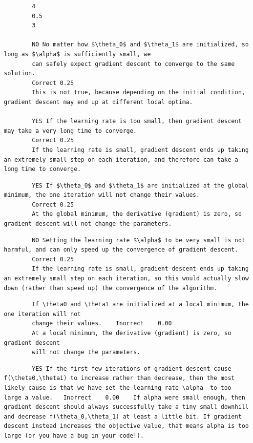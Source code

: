 \documentclass[11pt]{article} %
\begin{document}
	
	
	
	
	\newpage
		
		
		
		
		\begin{verbatim}
		4
		0.5
		3
		
		NO No matter how $\theta_0$ and $\theta_1$ are initialized, so long as $\alpha$ is sufficiently small, we 
		can safely expect gradient descent to converge to the same solution.	
		Correct	0.25	
		This is not true, because depending on the initial condition, gradient descent may end up at different local optima.
		
		YES If the learning rate is too small, then gradient descent may take a very long time to converge.	
		Correct	0.25	
		If the learning rate is small, gradient descent ends up taking an extremely small step on each iteration, and therefore can take a long time to converge.
		\end{verbatim}
		
		\begin{verbatim}
		YES If $\theta_0$ and $\theta_1$ are initialized at the global minimum, the one iteration will not change their values.	
		Correct	0.25	
		At the global minimum, the derivative (gradient) is zero, so gradient descent will not change the parameters.
		\end{verbatim}
		
		\begin{verbatim}
		NO Setting the learning rate $\alpha$ to be very small is not harmful, and can only speed up the convergence of gradient descent.	
		Correct	0.25	
		If the learning rate is small, gradient descent ends up taking an extremely small step on each iteration, so this would actually slow down (rather than speed up) the convergence of the algorithm.
		\end{verbatim}
		
		\begin{verbatim}
		If \theta0 and \theta1 are initialized at a local minimum, the one iteration will not 
		change their values.	Inorrect	0.00	
		At a local minimum, the derivative (gradient) is zero, so gradient descent 
		will not change the parameters.
		\end{verbatim}
		
		\begin{verbatim}
		YES If the first few iterations of gradient descent cause f(\theta0,\theta1) to increase rather than decrease, then the most likely cause is that we have set the learning rate \alpha  to too large a value.	Inorrect	0.00	If alpha were small enough, then gradient descent should always successfully take a tiny small downhill and decrease f(\theta_0,\theta_1) at least a little bit. If gradient descent instead increases the objective value, that means alpha is too large (or you have a bug in your code!).
		\end{verbatim}
		
\end{document}
